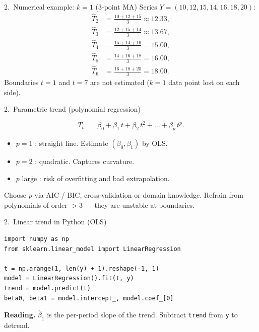 \documentclass[aspectratio=169]{beamer}
\begin{document}
\begin{frame}{2.~Numerical example: $k = 1$ (3-point MA)}
  Series $Y = (10, 12, 15, 14, 16, 18, 20)$:
  \[
  \begin{array}{rl}
    \widehat{T}_2 &= \tfrac{10 + 12 + 15}{3} \approx 12.33,\\
    \widehat{T}_3 &= \tfrac{12 + 15 + 14}{3} \approx 13.67,\\
    \widehat{T}_4 &= \tfrac{15 + 14 + 16}{3} = 15.00,\\
    \widehat{T}_5 &= \tfrac{14 + 16 + 18}{3} = 16.00,\\
    \widehat{T}_6 &= \tfrac{16 + 18 + 20}{3} = 18.00.
  \end{array}
  \]
  Boundaries $t = 1$ and $t = 7$ are not estimated ($k = 1$ data
  point lost on each side).
\end{frame}

\begin{frame}{2.~Parametric trend (polynomial regression)}
  \begin{defbox}
    \[
      T_t \;=\; \beta_0 + \beta_1\,t + \beta_2\,t^2 + \dots + \beta_p\,t^p.
    \]
  \end{defbox}
  \medskip
  \begin{itemize}
    \item $p = 1$ : straight line. Estimate $(\beta_0, \beta_1)$ by OLS.
    \item $p = 2$ : quadratic. Captures curvature.
    \item $p$ large : risk of overfitting and bad extrapolation.
  \end{itemize}
  \medskip
  \begin{infobox}
    Choose $p$ via AIC / BIC, cross-validation or domain knowledge.
    Refrain from polynomials of order $> 3$ — they are unstable at
    boundaries.
  \end{infobox}
\end{frame}

\begin{frame}[fragile]{2.~Linear trend in Python (OLS)}
\begin{lstlisting}
import numpy as np
from sklearn.linear_model import LinearRegression

t = np.arange(1, len(y) + 1).reshape(-1, 1)
model = LinearRegression().fit(t, y)
trend = model.predict(t)
beta0, beta1 = model.intercept_, model.coef_[0]
\end{lstlisting}
  \medskip
  \textbf{Reading.} $\widehat\beta_1$ is the per-period slope of the trend.
  Subtract \texttt{trend} from \texttt{y} to detrend.
\end{frame}
\end{document}
